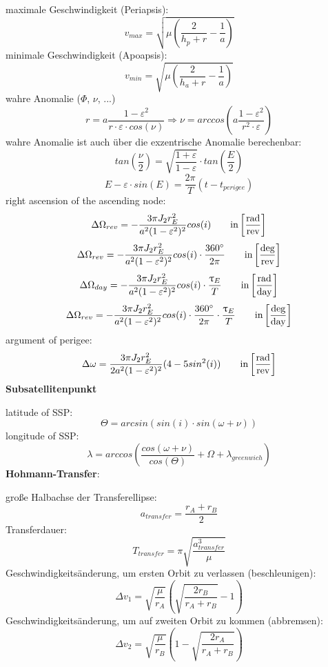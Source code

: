 \documentclass[a4paper,10pt]{article}
\newcommand{\f}{\textbf}
\begin{document}
\noindent maximale Geschwindigkeit (Periapsis):
\[v_{max} = \sqrt{\mu\left(\frac{2}{h_p+r} -\frac{1}{a}\right)}\]
minimale Geschwindigkeit (Apoapsis):
\[v_{min} = \sqrt{\mu\left(\frac{2}{h_a+r} -\frac{1}{a}\right)}\]
wahre Anomalie ($\Phi$, $\nu$, ...)
\[r = a\frac{1-\varepsilon^2}{r\cdot \varepsilon \cdot cos(\nu)} \Rightarrow \nu = arccos\left(a\frac{1-\varepsilon^2}{r^2\cdot \varepsilon}\right)\]
wahre Anomalie ist auch über die exzentrische Anomalie berechenbar:
\[tan\left(\frac{\nu}{2}\right) = \sqrt{\frac{1+\varepsilon}{1-\varepsilon}}\cdot tan\left(\frac{E}{2}\right)\]
\[E - \varepsilon \cdot sin(E) = \frac{2\pi}{T}(t-t_{perigee})\]
right ascension of the ascending node:
\[\Delta \Omega_{rev} = -\frac{3\pi J_2r_E^2}{a^2(1-\varepsilon^2)^2}cos(i) \text{\qquad  in} \left[\frac{\text{rad}}{\text{rev}}\right]\]
\[\Delta \Omega_{rev} = -\frac{3\pi J_2r_E^2}{a^2(1-\varepsilon^2)^2}cos(i) \cdot \frac{360^{\circ}}{2\pi} \text{\qquad  in} \left[\frac{\text{deg}}{\text{rev}}\right]\]
\[\Delta \Omega_{day} = -\frac{3\pi J_2r_E^2}{a^2(1-\varepsilon^2)^2}cos(i) \cdot \frac{\uptau_E}{T} \text{\qquad  in} \left[\frac{\text{rad}}{\text{day}}\right]\]
\[\Delta \Omega_{rev} = -\frac{3\pi J_2r_E^2}{a^2(1-\varepsilon^2)^2}cos(i) \cdot \frac{360^{\circ}}{2\pi}\cdot \frac{\uptau_E}{T} \text{\qquad  in} \left[\frac{\text{deg}}{\text{day}}\right]\]
argument of perigee:
\[\Delta \omega = \frac{3\pi J_2r_E^2}{2a^2(1-\varepsilon^2)^2}(4-5sin^2(i))\text{\qquad  in} \left[\frac{\text{rad}}{\text{rev}}\right]\]
\f{Subsatellitenpunkt}\\
\vspace*{5pt}

\noindent latitude of SSP: 
\[\Theta = arcsin(sin(i)\cdot sin(\omega + \nu))\]
longitude of SSP: 
\[\lambda = arccos\left(\frac{cos(\omega + \nu)}{cos(\Theta)} + \Omega + \lambda_{greenwich}\right)\]
\f{Hohmann-Transfer}:\\
\vspace*{5pt}

\noindent große Halbachse der Transferellipse:
\[a_{transfer} = \frac{r_A + r_B}{2}\]
Transferdauer: 
\[T_{transfer} = \pi \sqrt{\frac{a_{transfer}^3}{\mu}}\]
Geschwindigkeitsänderung, um ersten Orbit zu verlassen (beschleunigen): 
\[\Delta v_1 = \sqrt{\frac{\mu}{r_A}}\left(\sqrt{\frac{2r_B}{r_A + r_B}} -1 \right)\]
Geschwindigkeitsänderung, um auf zweiten Orbit zu kommen (abbremsen): 
\[\Delta v_2 = \sqrt{\frac{\mu}{r_B}}\left(1-\sqrt{\frac{2r_A}{r_A + r_B}} \right)\]
\vspace*{5pt}
\end{document}
